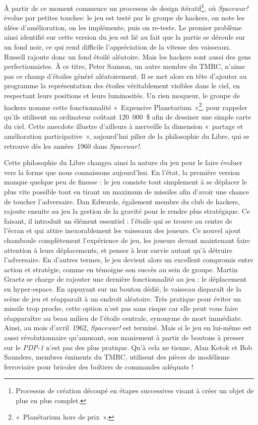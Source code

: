 \documentclass{FramateX}
\begin{document}
\begin{refsection}
À partir de ce moment commence un processus de design
itératif\footnote{Processus de création découpé en étapes successives
visant à créer un objet de plus en plus complet.}, où
 \textit{Spacewar!} évolue par petites touches: le jeu est testé par le groupe de hackers, on note les idées
d'amélioration, on les implémente, puis on re-teste. Le premier
problème ainsi identifié sur cette version du jeu est lié au fait que
la partie se déroule sur un fond noir, ce qui rend difficile
l'appréciation de la vitesse des vaisseaux. Russell rajoute donc un
fond étoilé aléatoire. Mais les hackers sont aussi des gens
perfectionnistes. À ce titre, Peter Samson, un autre membre du TMRC,
n'aime pas ce champ d'étoiles généré aléatoirement. Il se met alors en
tête d'ajouter au programme la représentation des étoiles véritablement
visibles dans le ciel, en respectant leurs positions et leurs
luminosités. Un rien moqueur, le groupe de hackers nomme cette
fonctionnalité «~Expensive
Planetarium~»\footnote{«~Planétarium
hors de prix~».}, pour rappeler qu'ils utilisent un ordinateur coûtant
120~000~\$ afin de dessiner une simple carte du ciel. Cette anecdote
illustre d'ailleurs à merveille la dimension «~partage et amélioration
participative~», aujourd'hui pilier de la philosophie du Libre, qui se
retrouve dès les années~1960 dans \textit{Spacewar!}.


Cette philosophie du Libre changea ainsi la nature du jeu pour le faire
évoluer vers la forme que nous connaissons aujourd'hui. En l'état, la
première version manque quelque peu de finesse : le jeu consiste tout
simplement à se déplacer le plus vite possible tout en tirant un
maximum de missiles afin d'avoir une chance de toucher l'adversaire.
Dan Edwards, également membre du
club de hackers, rajoute ensuite au
jeu la gestion de la gravité pour le rendre plus stratégique. Ce
faisant, il introduit un élément essentiel : l'étoile qui se trouve au
centre de l'écran et qui attire inexorablement les vaisseaux des
joueurs. Ce nouvel ajout chamboule complètement l'expérience de jeu,
les joueurs devant maintenant faire attention à leurs déplacements, et
penser à leur survie autant qu'à détruire l'adversaire. En d'autres
termes, le jeu devient alors un excellent compromis entre action et
stratégie, comme en témoigne son succès au sein de groupe. Martin
Graetz se charge de rajouter une dernière fonctionnalité au jeu : le
déplacement en hyper-espace. En appuyant sur un bouton dédié, le
vaisseau disparaît de la scène de jeu et réapparaît à un endroit
aléatoire. Très pratique pour éviter un missile trop proche, cette
option n'est pas sans risque car elle peut vous faire réapparaître au
beau milieu de l'étoile centrale, synonyme de mort immédiate. Ainsi, au
mois d'avril~1962,  \textit{Spacewar!} est
terminé. Mais si le jeu en lui-même est aussi révolutionnaire
qu'amusant, son maniement à partir de boutons à presser sur le \textit{PDP-1} n'est pas des plus pratique.
Qu'à cela ne tienne, Alan Kotok et Bob Saunders, membres éminents du
TMRC, utilisent des pièces de modélisme ferroviaire pour bricoler des
boîtiers de commandes adéquats !



\end{refsection}
\end{document}
